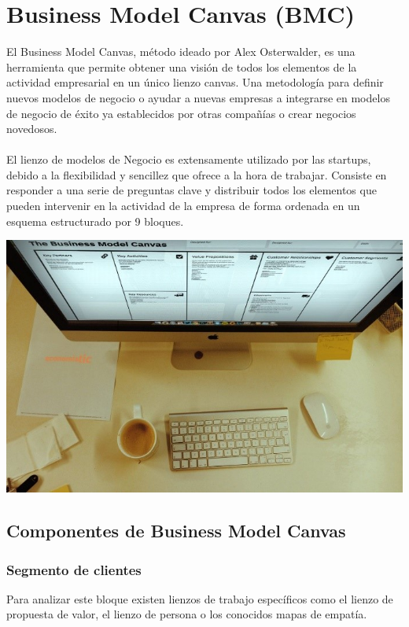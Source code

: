 \documentclass[10pt,a4paper]{article}
\begin{document}
		\newpage
		
		\section{Business Model Canvas (BMC)}
		
		El Business Model Canvas, método ideado por Alex Osterwalder, es una herramienta que permite obtener una visión de todos los elementos de la actividad empresarial en un único lienzo canvas. Una metodología para definir nuevos modelos de negocio o ayudar a nuevas empresas a integrarse en modelos de negocio de éxito ya establecidos por otras compañías o crear negocios novedosos.\\
		\\
		El lienzo de modelos de Negocio es extensamente utilizado por las startups, debido a la flexibilidad y sencillez que ofrece a la hora de trabajar. Consiste en responder a una serie de preguntas clave y distribuir todos los elementos que pueden intervenir en la actividad de la empresa de forma ordenada en un esquema estructurado por 9 bloques.
		
		\begin{center}
			\includegraphics[scale=1]{./Imagenes/img01}
		\end{center}
	
			\subsection{Componentes de Business Model Canvas}
			\vspace{\baselineskip}
				\subsubsection{Segmento de clientes}				
				Para analizar este bloque existen lienzos de trabajo específicos como el lienzo de propuesta de valor, el lienzo de persona o los conocidos mapas de empatía. 
				
\end{document}
